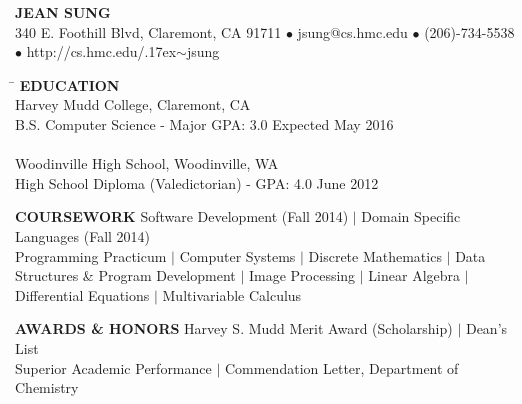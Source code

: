\documentclass[11pt]{article}
\makeatletter
\newcommand{\selfName}{\LARGE\textbf{JEAN SUNG}}
\newcommand{\addrA}{\small 340 E. Foothill Blvd, }
\newcommand{\addrB}{\small Claremont, CA 91711}
\newcommand{\email}{\small{jsung@cs.hmc.edu}}
\newcommand{\phone}{(206)-734-5538 }
\newcommand{\tildeText}{\raise.17ex\hbox{$\scriptstyle\sim$}}
\newcommand{\website}{\small{http://cs.hmc.edu/\tildeText jsung}}
\newcommand{\headerdot}{  $\bullet$  }
\newcommand{\vb}{ $\mid$ }
\newcommand{\sectionNL}{\\[-2pt]}
\makeatother
\begin{document}
\begin{center}
\selfName \\
 \addrA \addrB \headerdot \email \headerdot \phone \headerdot \website
\end{center}

\vspace{-15pt}


\begin{tabbing}
\hspace*{6.45in}\= \kill
{\textbf{EDUCATION} } \> \sectionNL
Harvey Mudd College, Claremont, CA \> \\
B.S. Computer Science - Major GPA: 3.0 \>Expected May 2016  \\ \\


Woodinville High School, Woodinville, WA \> \\
High School Diploma (Valedictorian) - GPA: 4.0 \>June 2012
\end{tabbing}


\begin{flushleft}
{\textbf{COURSEWORK}} Software Development (Fall 2014) \vb Domain Specific Languages (Fall 2014) \\
Programming Practicum \vb Computer Systems \vb Discrete Mathematics \vb Data Structures \& Program Development \vb Image Processing \vb Linear Algebra \vb Differential Equations \vb Multivariable Calculus  \\
\end{flushleft}

\begin{flushleft}
{\textbf{AWARDS \& HONORS}} Harvey S. Mudd Merit Award (Scholarship)\vb Dean's List \\
Superior Academic Performance \vb Commendation Letter, Department of Chemistry 
\end{flushleft} 
\end{document}
